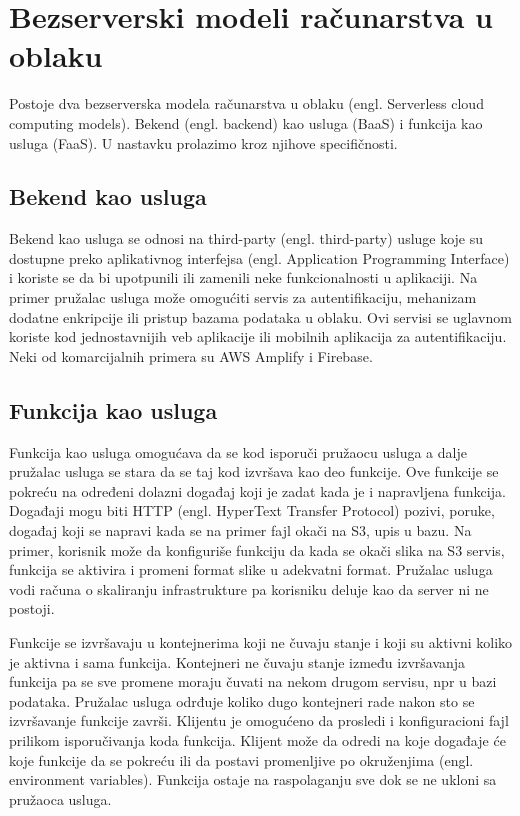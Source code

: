 \documentclass[12pt,oneside]{memoir}
\begin{document}
\section{Bezserverski modeli računarstva u oblaku}
Postoje dva bezserverska modela računarstva u oblaku (engl. Serverless cloud computing models). Bekend (engl. backend) kao usluga (BaaS) i funkcija kao usluga (FaaS). U nastavku prolazimo kroz njihove specifičnosti.

\subsection{Bekend kao usluga}

Bekend kao usluga se odnosi na third-party (engl. third-party) usluge koje su dostupne preko aplikativnog interfejsa (engl. Application Programming Interface) i koriste se da bi upotpunili ili zamenili neke funkcionalnosti u aplikaciji. Na primer pružalac usluga može omogućiti servis za autentifikaciju, mehanizam dodatne enkripcije ili pristup bazama podataka u oblaku. Ovi servisi se uglavnom koriste kod jednostavnijih veb aplikacije ili mobilnih aplikacija za autentifikaciju\cite{wis}\cite{bsa}. Neki od komarcijalnih primera su AWS Amplify i Firebase\cite{baasp}.

\subsection{Funkcija kao usluga}
Funkcija kao usluga omogućava da se kod isporuči pružaocu usluga a dalje pružalac usluga se stara da se taj kod izvršava kao deo funkcije. Ove funkcije se pokreću na određeni dolazni događaj koji je zadat kada je i napravljena funkcija. Događaji mogu biti HTTP (engl. HyperText Transfer Protocol) pozivi, poruke, događaj koji se napravi kada se na primer fajl okači na S3, upis u bazu. Na primer, korisnik može da konfiguriše funkciju da kada se okači slika na S3 servis, funkcija se aktivira i promeni format slike u adekvatni format. Pružalac usluga vodi računa o skaliranju infrastrukture pa korisniku deluje kao da server ni ne postoji. 

Funkcije se izvršavaju u kontejnerima koji ne čuvaju stanje i koji su aktivni koliko je aktivna i sama funkcija. Kontejneri ne čuvaju stanje između izvršavanja funkcija pa se sve promene moraju čuvati na nekom drugom servisu, npr u bazi podataka. Pružalac usluga odrđuje koliko dugo kontejneri rade nakon sto se izvršavanje funkcije završi. Klijentu je omogućeno da prosledi i konfiguracioni fajl prilikom isporučivanja koda funkcija. Klijent može da odredi na koje događaje će koje funkcije da se pokreću ili da postavi promenljive po okruženjima (engl. environment variables). Funkcija ostaje na raspolaganju sve dok se ne ukloni sa pružaoca usluga\cite{bsa}.
\end{document}
